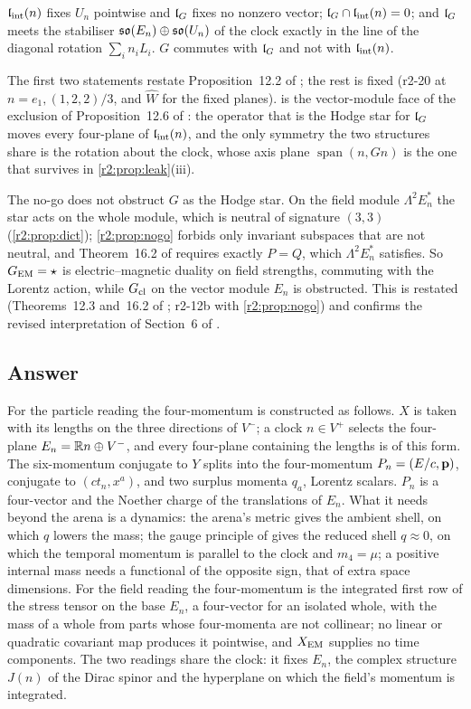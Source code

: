 \begin{proposition}
\label{r2:prop:twoalg}
$\mathfrak l_{\rm int}(n)$ fixes $U_n$ pointwise and $\mathfrak l_G$ fixes no nonzero vector; $\mathfrak l_G\cap\mathfrak l_{\rm int}(n)=0$; and $\mathfrak l_G$ meets the stabiliser $\mathfrak{so}(E_n)\oplus\mathfrak{so}(U_n)$ of the
clock exactly in the line of the diagonal rotation $\sum_in_iL_i$. $G$ commutes with $\mathfrak l_G$ and not with $\mathfrak l_{\rm int}(n)$.
\end{proposition}

The first two statements restate Proposition~12.2 of \cite{ES17}; the rest is fixed (r2-20 at $n=e_1,(1,2,2)/3$, and $\widehat W$ for the fixed planes).
 is the vector-module face of the exclusion of Proposition~12.6 of \cite{ES17}: the operator that is the Hodge star for $\mathfrak l_G$ moves every
four-plane of $\mathfrak l_{\rm int}(n)$, and the only symmetry the two structures share is the rotation about the clock, whose axis plane $\operatorname{span}(n,Gn)$ is the one
that survives in \cref{r2:prop:leak}(iii).

The no-go does not obstruct $G$ as the Hodge star. On the field module $\Lambda^2E_n^*$ the star acts on the whole module, which is neutral of signature $(3,3)$
(\cref{r2:prop:dict}); \cref{r2:prop:nogo} forbids only invariant subspaces that are not neutral, and Theorem~16.2 of \cite{ES17} requires exactly $P=Q$, which
$\Lambda^2E_n^*$ satisfies. So $G_{\rm EM}=\star$ is electric--magnetic duality on field strengths, commuting with the Lorentz action, while $G_{\rm cl}$ on the vector
module $E_n$ is obstructed. This is restated (Theorems~12.3 and~16.2 of \cite{ES17}; r2-12b with \cref{r2:prop:nogo}) and confirms the revised interpretation of Section~6
of \cite{FMB}.

\subsection{Answer}
\label{r2:sec:answer}

For the particle reading the four-momentum is constructed as follows. $X$ is taken with its lengths on the three directions of $V^-$; a clock $n\in V^+$
selects the four-plane $E_n=\mathbb{R} n\oplus V^-$, and every four-plane containing the lengths is of this form. The six-momentum conjugate to $Y$ splits into the
four-momentum $P_n=(E/c,\mathbf p)$, conjugate to $(ct_n,x^a)$, and two surplus momenta $q_a$, Lorentz scalars. $P_n$ is a four-vector and the Noether charge of
the translations of $E_n$. What it needs beyond the arena is a dynamics: the arena's metric gives the ambient shell, on which $q$ lowers the mass;
the gauge principle of \cite{ES17} gives the reduced shell $q\approx0$, on which the temporal momentum is parallel to the clock and $m_4=\mu$; a positive internal mass
needs a functional of the opposite sign, that of extra space dimensions. For the field reading the four-momentum is the integrated first row of the stress
tensor on the base $E_n$, a four-vector for an isolated whole, with the mass of a whole from parts whose four-momenta are not collinear; no linear or quadratic covariant map
produces it pointwise, and $X_{\rm EM}$ supplies no time components. The two readings share the clock: it fixes $E_n$, the complex structure $J(n)$ of the
Dirac spinor and the hyperplane on which the field's momentum is integrated.


